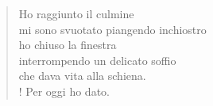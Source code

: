 
\begin{verse}
Ho raggiunto il culmine\\
mi sono svuotato piangendo inchiostro\\
ho chiuso la finestra\\
interrompendo un delicato soffio\\
che dava vita alla schiena.\\!
Per oggi ho dato.

\end{verse}